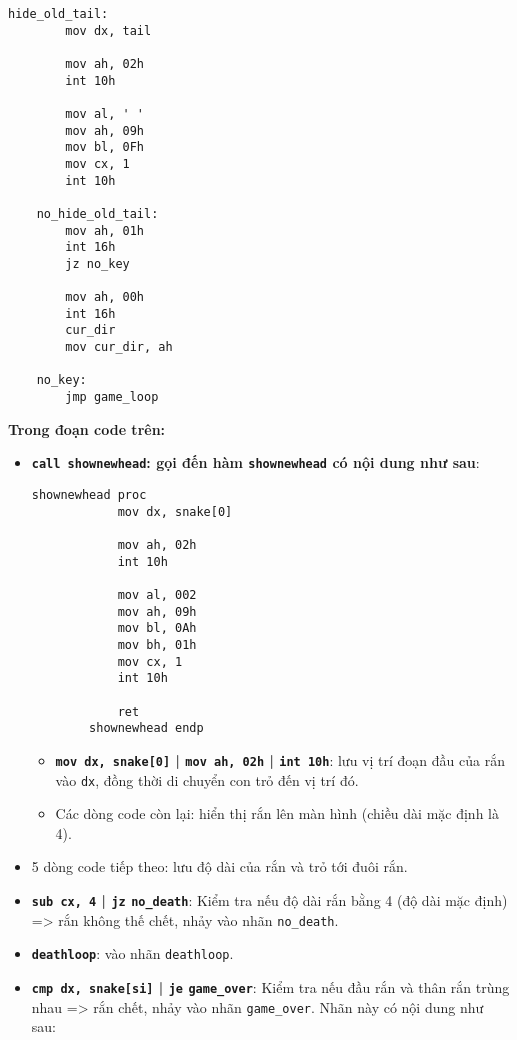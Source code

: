 \begin{itemize}
\begin{lstlisting}[style=asm]
    hide_old_tail:
        mov dx, tail            
        
        mov ah, 02h              
        int 10h
    
        mov al, ' '              
        mov ah, 09h              
        mov bl, 0Fh
        mov cx, 1     
        int 10h  
        
    no_hide_old_tail:
        mov ah, 01h             
        int 16h
        jz no_key
    
        mov ah, 00h           
        int 16h                 
        cur_dir
        mov cur_dir, ah
    
    no_key:
        jmp game_loop           
\end{lstlisting}

\vspace{0.5cm}
\noindent \textbf{Trong đoạn code trên:}
\begin{itemize}
    \itemsep0.3cm
    \item \textbf{\texttt{call shownewhead}: gọi đến hàm \texttt{shownewhead} có nội dung như sau}:
    
    \vspace{0.3cm}
    \begin{lstlisting}[style=asm]
        shownewhead proc
            mov dx, snake[0]      
            
            mov ah, 02h        
            int 10h            
            
            mov al, 002        
            mov ah, 09h       
            mov bl, 0Ah
            mov bh, 01h
            mov cx, 1
            int 10h 
            
            ret
        shownewhead endp                          
    \end{lstlisting}
    \vspace{0.3cm}
    
    \begin{itemize}
        \itemsep0.2cm
        \item \textbf{\texttt{mov dx, snake[0]} | \texttt{mov ah, 02h} | \texttt{int 10h}}: lưu vị trí đoạn đầu của rắn vào \texttt{dx}, đồng thời di chuyển con trỏ đến vị trí đó.
        \item Các dòng code còn lại: hiển thị rắn lên màn hình (chiều dài mặc định là 4).
    \end{itemize}

    \item 5 dòng code tiếp theo: lưu độ dài của rắn và trỏ tới đuôi rắn.
    \item \textbf{\texttt{sub cx, 4} | \texttt{jz} \texttt{no\_death}}: Kiểm tra nếu độ dài rắn bằng 4 (độ dài mặc định) => rắn không thế chết, nhảy vào nhãn \texttt{no\_death}.
    \item \textbf{\texttt{deathloop}}: vào nhãn \texttt{deathloop}.
    \item \textbf{\texttt{cmp dx, snake[si]} | \texttt{je} \texttt{game\_over}}: Kiểm tra nếu đầu rắn và thân rắn trùng nhau => rắn chết, nhảy vào nhãn \texttt{game\_over}. Nhãn này có nội dung như sau:
    

\end{itemize}
\end{itemize}
